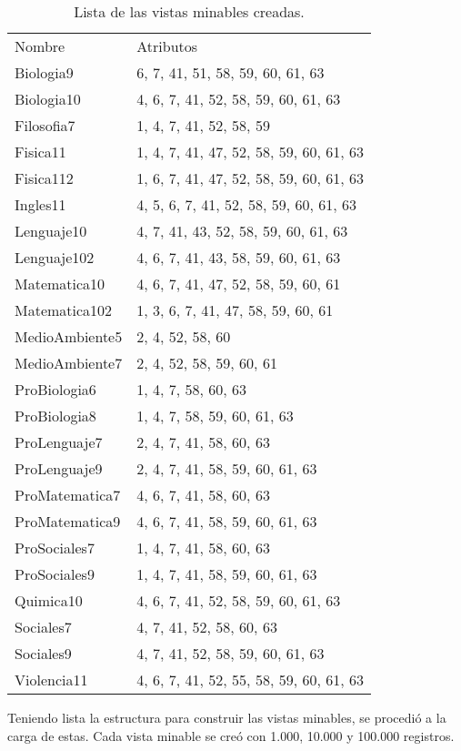 \begin{table}[!Hhtb]
\centering
\begin{tabular}{|p{3.5cm}|p{7cm}|}
\hline
	\rowcolor[gray]{0.9} 
	\multicolumn{2}{|c|}{
	\textbf{Vistas minables}}\\
\hline
	\rowcolor[gray]{0.5}
	Nombre & Atributos\\
\hline
Biologia9 & 6, 7, 41, 51, 58, 59, 60, 61, 63 \\
\hline
Biologia10 & 4, 6, 7, 41, 52, 58, 59, 60, 61, 63 \\
\hline
Filosofia7 & 1, 4, 7, 41, 52, 58, 59 \\
\hline
Fisica11 & 1, 4, 7, 41, 47, 52, 58, 59, 60, 61, 63 \\
\hline
Fisica112 & 1, 6, 7, 41, 47, 52, 58, 59, 60, 61, 63 \\
\hline
Ingles11 & 4, 5, 6, 7, 41, 52, 58, 59, 60, 61, 63 \\
\hline
Lenguaje10 & 4, 7, 41, 43, 52, 58, 59, 60, 61, 63 \\
\hline
Lenguaje102 & 4, 6, 7, 41, 43, 58, 59, 60, 61, 63 \\
\hline
Matematica10 & 4, 6, 7, 41, 47, 52, 58, 59, 60, 61 \\
\hline
Matematica102 & 1, 3, 6, 7, 41, 47, 58, 59, 60, 61 \\
\hline
MedioAmbiente5 & 2, 4, 52, 58, 60 \\
\hline
MedioAmbiente7 & 2, 4, 52, 58, 59, 60, 61 \\
\hline
ProBiologia6 & 1, 4, 7, 58, 60, 63 \\
\hline
ProBiologia8 & 1, 4, 7, 58, 59, 60, 61, 63 \\
\hline
ProLenguaje7 & 2, 4, 7, 41, 58, 60, 63 \\
\hline
ProLenguaje9 & 2, 4, 7, 41, 58, 59, 60, 61, 63 \\
\hline
ProMatematica7 & 4, 6, 7, 41, 58, 60, 63 \\
\hline
ProMatematica9 & 4, 6, 7, 41, 58, 59, 60, 61, 63 \\
\hline
ProSociales7 & 1, 4, 7, 41, 58, 60, 63 \\
\hline
ProSociales9 & 1, 4, 7, 41, 58, 59, 60, 61, 63 \\
\hline
Quimica10 & 4, 6, 7, 41, 52, 58, 59, 60, 61, 63 \\
\hline
Sociales7 & 4, 7, 41, 52, 58, 60, 63  \\
\hline
Sociales9 & 4, 7, 41, 52, 58, 59, 60, 61, 63  \\
\hline
Violencia11 & 4, 6, 7, 41, 52, 55, 58, 59, 60, 61, 63 \\
\hline
\end{tabular}
\caption{Lista de las vistas minables creadas.}
\label{tab:cuadro32}
\end{table}
Teniendo lista la estructura para construir las vistas minables, se procedió a la carga de estas. Cada vista minable se creó con 1.000, 10.000 y 100.000 registros.

